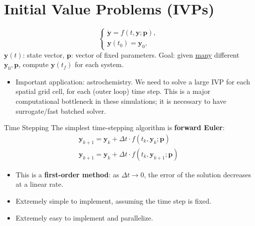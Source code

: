 \section{Initial Value Problems (IVPs)}

\newcommand{\by}{\mathbf{y}}
\newcommand{\bp}{\mathbf{p}}
\begin{frame}
$$\begin{cases}
    \dot{\by} = f(t, \by; \bp),  \\
    \by(t_0) = \by_0,
\end{cases}$$
$\by(t)$: state vector, $\bp$: vector of fixed parameters. Goal: given \underline{many} different $\by_0, \bp$, compute $\by(t_f)$ for each system.

\begin{itemize}
    \item Important application: astrochemistry. We need to solve a large IVP for each spatial grid cell, for each (outer loop) time step. This is a major computational bottleneck in these simulations; it is necessary to have surrogate/fast batched solver.
\end{itemize}
    
\end{frame}

\begin{frame}{Time Stepping}
The simplest time-stepping algorithm is \textbf{forward Euler}:
\begin{gather}
\by_{k+1} = \by_k + \Delta t \cdot f(t_k, \by_k; \bp) \tag{FE} \\
\by_{k+1} = \by_k + \Delta t \cdot f(t_k, \by_{k+1}; \bp)\label{eq:BE} \tag{BE} 
\end{gather}


\begin{itemize}
    \item This is a \textbf{first-order method}: as $\Delta t \to 0$, the error of the solution decreases at a linear rate.
    \item Extremely simple to implement, assuming the time step is fixed.
    \item Extremely easy to implement and parallelize.
    
\end{itemize}
\end{frame}

